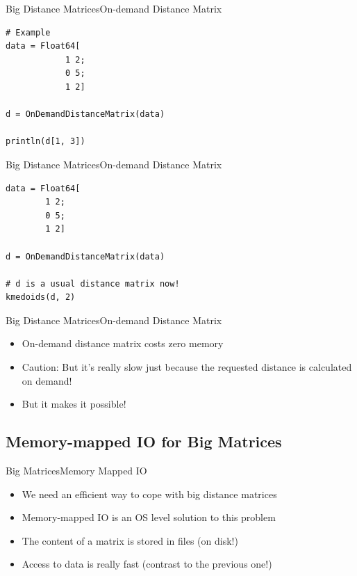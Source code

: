 \documentclass[11pt]{beamer}
\begin{document}
\begin{frame}[fragile]{Big Distance Matrices}{On-demand Distance Matrix}
\begin{lstlisting}
# Example 
data = Float64[
			1 2; 
			0 5; 
			1 2]

d = OnDemandDistanceMatrix(data)

println(d[1, 3])	
\end{lstlisting}
\end{frame} 


\begin{frame}[fragile]{Big Distance Matrices}{On-demand Distance Matrix}
\begin{lstlisting}
data = Float64[
		1 2; 
		0 5; 
		1 2]
		
d = OnDemandDistanceMatrix(data)
		
# d is a usual distance matrix now!
kmedoids(d, 2)	
\end{lstlisting}
\end{frame} 


\begin{frame}[fragile]{Big Distance Matrices}{On-demand Distance Matrix}
\begin{itemize}
	\item On-demand distance matrix costs zero memory
	\item Caution: But it's really slow just because the requested distance is calculated on demand!
	\item But it makes it possible! \Winkey
\end{itemize}
\end{frame} 

\subsection{Memory-mapped IO for Big Matrices}
\begin{frame}[fragile]{Big Matrices}{Memory Mapped IO}
	\begin{itemize}
		\item We need an efficient way to cope with big distance matrices 
		\item Memory-mapped IO is an OS level solution to this problem
		\item The content of a matrix is stored in files (on disk!)
		\item Access to data is really fast \Cooley (contrast to the previous one!)
	\end{itemize}
\end{frame} 
\end{document}
